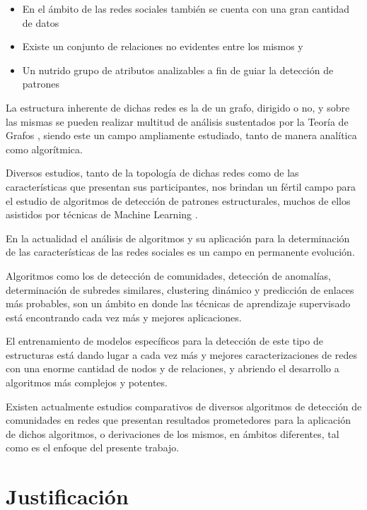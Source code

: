 \documentclass[
	11pt,oneside,a4paper,
	headsepline,footsepline,
	fleqn,
]{memoir}
\begin{document}
\begin{itemize}
	\item En el ámbito de las redes sociales también se cuenta con una gran cantidad de datos
	\item Existe un conjunto de relaciones no evidentes entre los mismos y
	\item Un nutrido grupo de atributos analizables a fin de guiar la detección de patrones 
\end{itemize}

La estructura inherente de dichas redes es la de un grafo, dirigido o no, y sobre las mismas se pueden realizar multitud de análisis sustentados por la Teoría de Grafos \cite{West2001}, siendo este un campo ampliamente estudiado, tanto de manera analítica como algorítmica.

Diversos estudios, tanto de la topología de dichas redes \cite{Barnes1983} como de las características que presentan sus participantes, nos brindan un fértil campo para el estudio de algoritmos de detección de patrones estructurales, muchos de ellos asistidos por técnicas de Machine Learning \cite{Alharbi2021}.

En la actualidad el análisis de algoritmos y su aplicación para la determinación de las características de las redes sociales es un campo en permanente evolución.

Algoritmos como los de detección de comunidades\cite{wang2015review}, detección de anomalías\cite{kaur2016survey}, determinación de subredes similares, clustering dinámico\cite{boccaletti2007detecting} y predicción de enlaces más probables\cite{kushwah2016review}, son un ámbito en donde las técnicas de aprendizaje supervisado está encontrando cada vez más y mejores aplicaciones.

El entrenamiento de modelos específicos para la detección de este tipo de estructuras está dando lugar a cada vez más y mejores caracterizaciones de redes con una enorme cantidad de nodos y de relaciones, y abriendo el desarrollo a algoritmos más complejos y potentes.

Existen actualmente estudios comparativos de diversos algoritmos de detección de comunidades en redes \cite{PhysRevE.80.056117} que presentan resultados prometedores para la aplicación de dichos algoritmos, o derivaciones de los mismos, en ámbitos diferentes, tal como es el enfoque del presente trabajo.

\section {Justificación}
\end{document}
